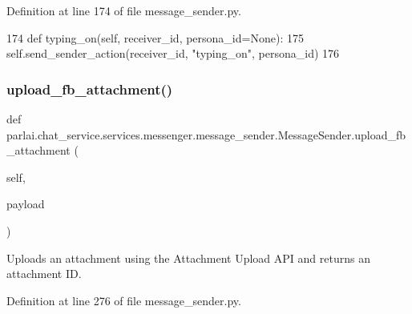 Definition at line 174 of file message\+\_\+sender.\+py.


\begin{DoxyCode}
174     \textcolor{keyword}{def }typing\_on(self, receiver\_id, persona\_id=None):
175         self.send\_sender\_action(receiver\_id, \textcolor{stringliteral}{"typing\_on"}, persona\_id)
176 
\end{DoxyCode}
\mbox{\label{classparlai_1_1chat__service_1_1services_1_1messenger_1_1message__sender_1_1MessageSender_a7b12a4f091ba64baa59c0749f8531190}} 
\subsubsection{\texorpdfstring{upload\+\_\+fb\+\_\+attachment()}{upload\_fb\_attachment()}}
{\footnotesize\ttfamily def parlai.\+chat\+\_\+service.\+services.\+messenger.\+message\+\_\+sender.\+Message\+Sender.\+upload\+\_\+fb\+\_\+attachment (\begin{DoxyParamCaption}\item[{}]{self,  }\item[{}]{payload }\end{DoxyParamCaption})}

\begin{DoxyVerb}Uploads an attachment using the Attachment Upload API and returns an attachment
ID.
\end{DoxyVerb}
 

Definition at line 276 of file message\+\_\+sender.\+py.


